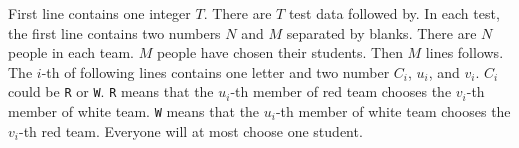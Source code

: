 First line contains one integer $T$. There are $T$ test data followed by.
In each test, the first line contains two numbers $N$ and $M$ separated by 
blanks. There are $N$ people in each team. $M$ people have chosen their 
students. Then $M$ lines follows. The $i$-th of following lines contains 
one letter and two number $C_i$, $u_i$, and $v_i$. $C_i$ could be \verb+R+ 
or \verb+W+. \verb+R+ means that the $u_i$-th member of red team chooses 
the $v_i$-th member of white team. \verb+W+ means that the
$u_i$-th member of white team chooses the $v_i$-th red team. 
Everyone will at most choose one student.
